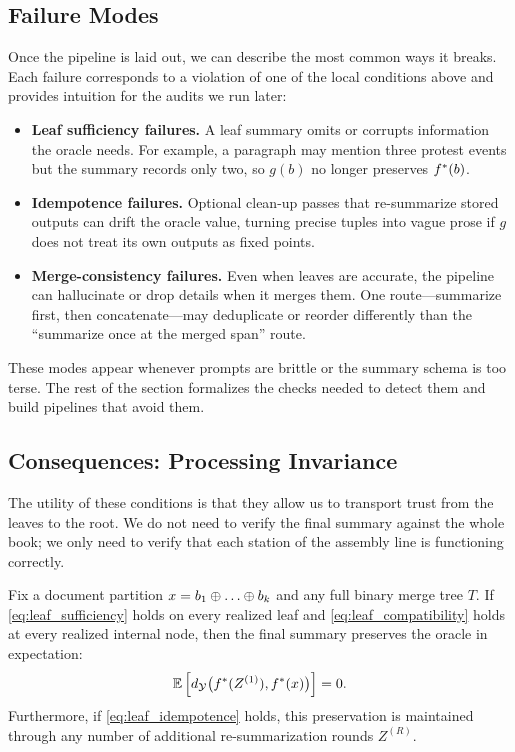 \subsection{Failure Modes}

Once the pipeline is laid out, we can describe the most common ways it breaks. Each failure corresponds to a violation of one of the local conditions above and provides intuition for the audits we run later:
\begin{itemize}
    \item \textbf{Leaf sufficiency failures.} A leaf summary omits or corrupts information the oracle needs. For example, a paragraph may mention three protest events but the summary records only two, so $g(b)$ no longer preserves $f^{\ast}(b)$.
    \item \textbf{Idempotence failures.} Optional clean-up passes that re-summarize stored outputs can drift the oracle value, turning precise tuples into vague prose if $g$ does not treat its own outputs as fixed points.
    \item \textbf{Merge-consistency failures.} Even when leaves are accurate, the pipeline can hallucinate or drop details when it merges them. One route---summarize first, then concatenate---may deduplicate or reorder differently than the ``summarize once at the merged span'' route.
\end{itemize}
These modes appear whenever prompts are brittle or the summary schema is too terse. The rest of the section formalizes the checks needed to detect them and build pipelines that avoid them.

\subsection{Consequences: Processing Invariance}

The utility of these conditions is that they allow us to transport trust from the leaves to the root. We do not need to verify the final summary against the whole book; we only need to verify that each station of the assembly line is functioning correctly.

\begin{theorem}\label{thm:one-pass}
Fix a document partition $x = b_1 \concat \dots \concat b_k$ and any full binary merge tree $T$. If \ref{eq:leaf_sufficiency} holds on every realized leaf and \ref{eq:leaf_compatibility} holds at every realized internal node, then the final summary preserves the oracle in expectation:
\[
\mathbb{E}\left[d_{\mathcal{Y}}\big(f^{\ast}(Z^{(1)}), f^{\ast}(x)\big)\right] = 0.
\]
Furthermore, if \ref{eq:leaf_idempotence} holds, this preservation is maintained through any number of additional re-summarization rounds $Z^{(R)}$.
\end{theorem}

